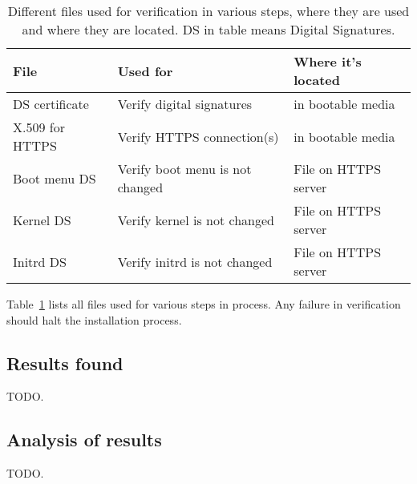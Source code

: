 \begin{table}[!ht]
  \def\arraystretch{1.1}%
  \begin{center}
    \begin{tabular}{| l | l | l |}
      \hline
      File            & Used for                        & Where it's located   \\
      \hline
      DS certificate  & Verify digital signatures       & in bootable media    \\
      X.509 for HTTPS & Verify HTTPS connection(s)      & in bootable media    \\
      Boot menu DS    & Verify boot menu is not changed & File on HTTPS server \\
      Kernel DS       & Verify kernel is not changed    & File on HTTPS server \\
      Initrd DS       & Verify initrd is not changed    & File on HTTPS server \\
      \hline
    \end{tabular}
    \caption{Different files used for verification in various steps,
      where they are used and where they are located. DS in table
      means Digital Signatures.\label{tab:verification_files}}
  \end{center}
\end{table}

Table~\ref{tab:verification_files} lists all files used for various
steps in process. Any failure in verification should halt the installation process.


\subsection{Results found}

TODO.

\subsection{Analysis of results}

TODO.
